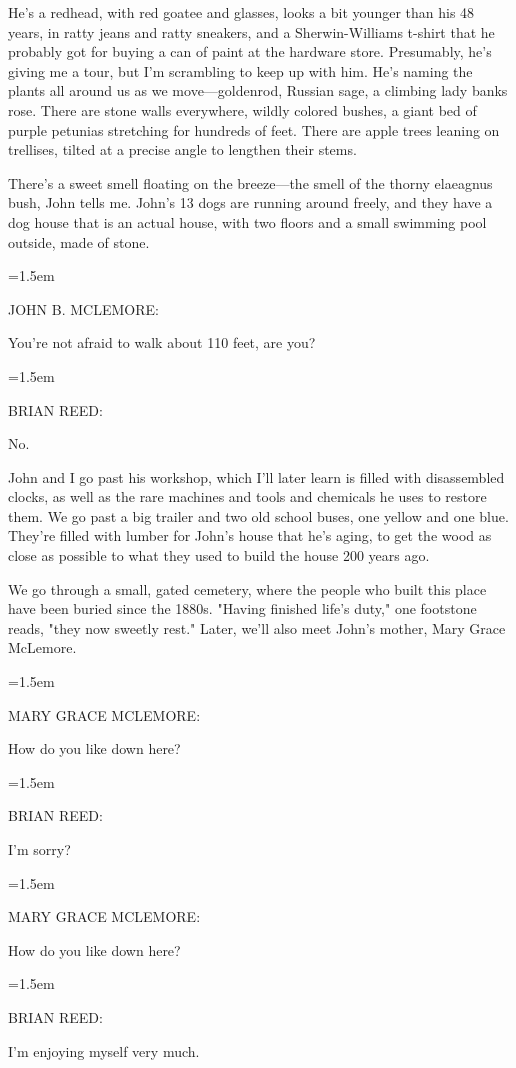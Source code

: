\documentclass[10pt,a4paper]{article}
\newcommand{\speakerlabel}[1]{{\plantin\color{speakerblue}\MakeUppercase{#1}:}}
\newenvironment{speech}[1]{%
		\par\medskip
		\begin{list}{}{%
			\leftmargin=1.5em
			\rightmargin=0pt
			\topsep=0pt
			\partopsep=0pt
			\parsep=0.5\baselineskip
			\itemsep=0pt}%
		\item\speakerlabel{#1}\enspace\ignorespaces
	}{\end{list}}
\newenvironment{narration}[1]{%
		\par\medskip\noindent\speakerlabel{#1}\enspace\ignorespaces
	}{\par\medskip}
\begin{document}
\begin{narration}{BRIAN REED}
He's a redhead, with red goatee and glasses, looks a bit younger than his 48 years, in ratty jeans and ratty sneakers, and a Sherwin-Williams t-shirt that he probably got for buying a can of paint at the hardware store. Presumably, he's giving me a tour, but I'm scrambling to keep up with him. He's naming the plants all around us as we move—goldenrod, Russian sage, a climbing lady banks rose. There are stone walls everywhere, wildly colored bushes, a giant bed of purple petunias stretching for hundreds of feet. There are apple trees leaning on trellises, tilted at a precise angle to lengthen their stems.

There's a sweet smell floating on the breeze—the smell of the thorny elaeagnus bush, John tells me. John's 13 dogs are running around freely, and they have a dog house that is an actual house, with two floors and a small swimming pool outside, made of stone.
\end{narration}
\begin{speech}{JOHN B. McLEMORE}
You're not afraid to walk about 110 feet, are you?
\end{speech}
\begin{speech}{BRIAN REED}
No.
\end{speech}
\begin{narration}{BRIAN REED}
John and I go past his workshop, which I'll later learn is filled with disassembled clocks, as well as the rare machines and tools and chemicals he uses to restore them. We go past a big trailer and two old school buses, one yellow and one blue. They're filled with lumber for John's house that he's aging, to get the wood as close as possible to what they used to build the house 200 years ago.

We go through a small, gated cemetery, where the people who built this place have been buried since the 1880s. "Having finished life's duty," one footstone reads, "they now sweetly rest." Later, we'll also meet John's mother, Mary Grace McLemore.
\end{narration}
\begin{speech}{MARY GRACE McLEMORE}
How do you like down here?
\end{speech}
\begin{speech}{BRIAN REED}
I'm sorry?
\end{speech}
\begin{speech}{MARY GRACE McLEMORE}
How do you like down here?
\end{speech}
\begin{speech}{BRIAN REED}
I'm enjoying myself very much.
\end{speech}
\end{document}
